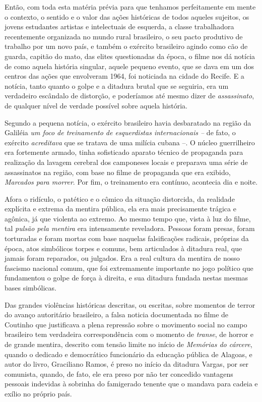 Então, com toda esta matéria prévia para que tenhamos perfeitamente em
mente o contexto, o sentido e o valor das ações históricas de todos
aqueles sujeitos, os jovens estudantes artistas e intelectuais de
esquerda, a classe trabalhadora recentemente organizada no mundo rural
brasileiro, o seu pacto produtivo de trabalho por um novo país, e também
o exército brasileiro agindo como cão de guarda, capitão do mato, das
elites questionadas da época, o filme nos dá notícia de como aquela
história singular, aquele pequeno evento, que se dava em um dos centros
das ações que envolveram 1964, foi noticiada na cidade do Recife. E a
notícia, tanto quanto o golpe e a ditadura brutal que se seguiria, era
um verdadeiro escândalo de distorção, e poderíamos até mesmo dizer de
\emph{assassinato}, de qualquer nível de verdade possível sobre aquela
história.

Segundo a pequena notícia, o exército brasileiro havia desbaratado na
região da Galiléia \emph{um foco de treinamento de esquerdistas
internacionais --} de fato, o exército \emph{acreditava} que se tratava
de uma milícia cubana --. O núcleo guerrilheiro era fortemente armado,
tinha sofisticado aparato técnico de propaganda para realização da
lavagem cerebral dos camponeses locais e preparava uma série de
assassinatos na região, com base no filme de propaganda que era exibido,
\emph{Marcados para morrer}. Por fim, o treinamento era contínuo,
acontecia dia e noite.

Afora o ridículo, o patético e o cômico da situação distorcida, da
realidade explícita e extrema da mentira pública, ela era mais
precisamente trágica e agônica, já que violenta ao extremo. Ao mesmo
tempo que, vista à luz do filme, tal \emph{pulsão pela mentira} era
intensamente reveladora. Pessoas foram presas, foram torturadas e foram
mortas com base naquelas falsificações radicais, próprias da época, atos
simbólicos torpes e comuns, bem articulados à ditadura real, que jamais
foram reparados, ou julgados. Era a real cultura da mentira de nosso
fascismo nacional comum, que foi extremamente importante no jogo
político que fundamentou o golpe de força à direita, e sua ditadura
fundada nestas mesmas bases simbólicas.

Das grandes violências históricas descritas, ou escritas, sobre momentos
de terror do avanço autoritário brasileiro, a falsa noticia documentada
no filme de Coutinho que justificava a plena repressão sobre o movimento
social no campo brasileiro tem verdadeira correspondência com o momento
de \emph{transe}, de horror e de grande mentira, descrito com tensão
limite no início de \emph{Memórias do cárcere}, quando o dedicado e
democrático funcionário da educação pública de Alagoas, e autor do
livro, Graciliano Ramos, é preso no início da ditadura Vargas, por ser
comunista, quando, de fato, ele era preso por não ter concedido
vantagens pessoais indevidas à sobrinha do famigerado tenente que o
mandava para cadeia e exílio no próprio país.

